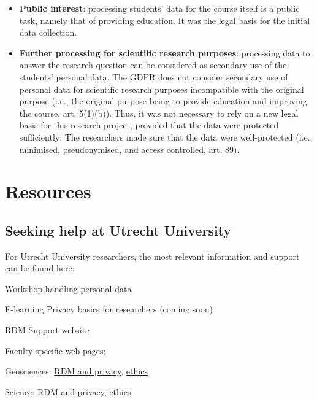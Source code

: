 \documentclass[
]{book}
\providecommand{\tightlist}{%
  \setlength{\itemsep}{0pt}\setlength{\parskip}{0pt}}
\begin{document}
\begin{itemize}
  \begin{itemize}
  \tightlist
  \item
    \textbf{Public interest}: processing students' data for the course itself is a
    public task, namely that of providing education. It was the legal basis for
    the initial data collection.
  \item
    \textbf{Further processing for scientific research purposes}: processing data to
    answer the research question can be considered as secondary use of the
    students' personal data. The GDPR does not consider secondary use of personal
    data for scientific research purposes incompatible with the original purpose
    (i.e., the original purpose being to provide education and improving the
    course, art. 5(1)(b)).
    Thus, it was not necessary to rely on a new legal basis for this research
    project, provided that the data were protected sufficiently: The researchers
    made sure that the data were well-protected (i.e., minimised, pseudonymised,
    and access controlled, art. 89).
  \end{itemize}
\end{itemize}

\hypertarget{part-resources}{%
\part*{Resources}\label{part-resources}}

\hypertarget{seeking-help}{%
\chapter{Seeking help at Utrecht University}\label{seeking-help}}

For Utrecht University researchers, the most relevant information and support
can be found here:

\href{https://www.uu.nl/en/research/research-data-management/training-workshops/handling-personal-data-in-research}{Workshop handling personal data}

E-learning Privacy basics for researchers (coming soon)

\href{https://www.uu.nl/rdm}{RDM Support website}

Faculty-specific web pages:

Geosciences: \href{https://geo-data-support.sites.uu.nl/}{RDM and privacy},
\href{https://sciencegeo-erb.sites.uu.nl/}{ethics}

Science: \href{https://science-data-support.sites.uu.nl/}{RDM and privacy},
\href{https://sciencegeo-erb.sites.uu.nl/}{ethics}
\end{document}
